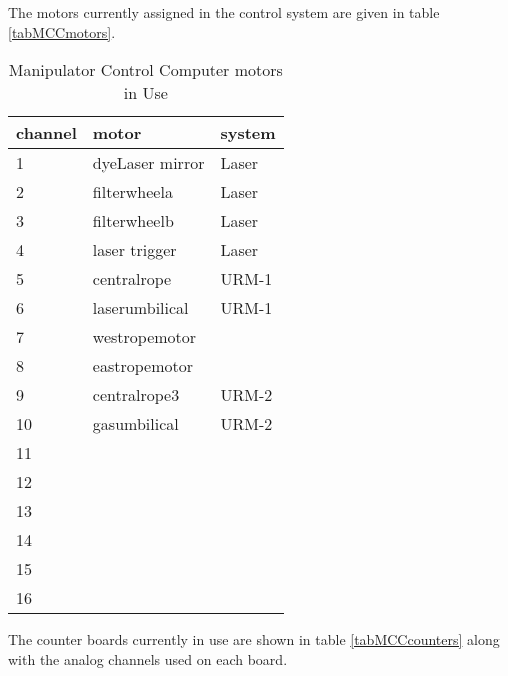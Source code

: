 The motors currently assigned in the control system are given in
table \ref{tabMCCmotors}.  
\begin{table}[htb]
\begin{center}
\begin{tabular}{|l|l|l|}
\hline
channel &  motor  & system\\
\hline
 1 & dyeLaser mirror   & Laser\\
 2 & filterwheela      & Laser\\
 3 & filterwheelb      & Laser\\
 4 & laser trigger     & Laser\\
 5 & centralrope       & URM-1\\
 6 & laserumbilical    & URM-1\\
 7 & westropemotor     & \\
 8 & eastropemotor     & \\
\hline
 9 & centralrope3      & URM-2\\
10 & gasumbilical      & URM-2\\
11 & &\\
12 & &\\
13 & &\\
14 & &\\
15 & &\\
16 & &\\
\hline
\end{tabular}
\caption[Manipulator Control Computer motors  in Use]
        {Manipulator Control Computer motors in Use
        }
\end{center}
\end{table}
The counter boards currently in use are shown in table \ref{tabMCCcounters}
along with the analog channels used on each board.
